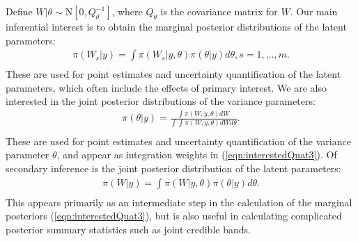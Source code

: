 \documentclass[ba]{imsart}
\begin{document}
Define $W|\theta\sim\text{N}\left[ 0,Q^{-1}_{\theta}\right]$, where $Q_{\theta}$ is the covariance matrix for $W$. Our main inferential interest is to obtain the marginal posterior distributions of the latent parameters:
\begin{equation}\begin{aligned}\label{eqn:interestedQuat3}
\pi(W_{s}|y) = \int \pi(W_{s}|y,\theta) \pi(\theta|y) d\theta, s = 1,\ldots,m .  \\
\end{aligned}\end{equation}
These are used for point estimates and uncertainty quantification of the latent parameters, which often include the effects of primary interest. We are also interested in the joint posterior distributions of the variance parameters:
\begin{equation}\begin{aligned}\label{eqn:interestedQuat1}
\pi(\theta|y) = \frac{\int \pi(W,y,\theta) dW}{\int_{} \int_{} \pi(W,y,\theta) dW d\theta } . \\
\end{aligned}\end{equation}
These are used for point estimates and uncertainty quantification of the variance parameter $\theta$, and appear as integration weights in (\ref{eqn:interestedQuat3}). Of secondary inference is the joint posterior distribution of the latent parameters:
\begin{equation}\begin{aligned}\label{eqn:interestedQuat2}
\pi(W|y) = \int \pi(W|y,\theta) \pi(\theta|y) d\theta .  \\
\end{aligned}\end{equation}
This appears primarily as an intermediate step in the calculation of the marginal posteriors (\ref{eqn:interestedQuat3}), but is also useful in calculating complicated posterior summary statistics such as joint credible bands.
\end{document}
